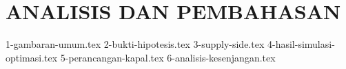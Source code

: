 \chapter{ANALISIS DAN PEMBAHASAN}
\label{chap:analisis-pembahasan}

{1-gambaran-umum.tex}
{2-bukti-hipotesis.tex}
{3-supply-side.tex}
{4-hasil-simulasi-optimasi.tex}
{5-perancangan-kapal.tex}
{6-analisis-kesenjangan.tex}
